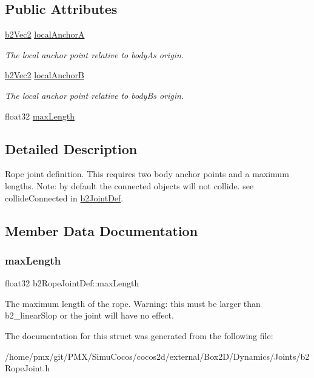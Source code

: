 \subsection*{Public Attributes}
\begin{DoxyCompactItemize}
\item 
\mbox{\label{structb2RopeJointDef_ab680fcc3cd44741a7a824ddff86ff01e}} 
\hyperlink{structb2Vec2}{b2\+Vec2} \hyperlink{structb2RopeJointDef_ab680fcc3cd44741a7a824ddff86ff01e}{local\+AnchorA}
\begin{DoxyCompactList}\small\item\em The local anchor point relative to bodyA\textquotesingle{}s origin. \end{DoxyCompactList}\item 
\mbox{\label{structb2RopeJointDef_a3271da0e4027e25546aa6a81e8fbe4e2}} 
\hyperlink{structb2Vec2}{b2\+Vec2} \hyperlink{structb2RopeJointDef_a3271da0e4027e25546aa6a81e8fbe4e2}{local\+AnchorB}
\begin{DoxyCompactList}\small\item\em The local anchor point relative to bodyB\textquotesingle{}s origin. \end{DoxyCompactList}\item 
float32 \hyperlink{structb2RopeJointDef_a6efdcae22e2bdcfc3aae62da1a5f0d69}{max\+Length}
\end{DoxyCompactItemize}


\subsection{Detailed Description}
Rope joint definition. This requires two body anchor points and a maximum lengths. Note\+: by default the connected objects will not collide. see collide\+Connected in \hyperlink{structb2JointDef}{b2\+Joint\+Def}. 

\subsection{Member Data Documentation}
\mbox{\label{structb2RopeJointDef_a6efdcae22e2bdcfc3aae62da1a5f0d69}} 
\subsubsection{\texorpdfstring{max\+Length}{maxLength}}
{\footnotesize\ttfamily float32 b2\+Rope\+Joint\+Def\+::max\+Length}

The maximum length of the rope. Warning\+: this must be larger than b2\+\_\+linear\+Slop or the joint will have no effect. 

The documentation for this struct was generated from the following file\+:\begin{DoxyCompactItemize}
\item 
/home/pmx/git/\+P\+M\+X/\+Simu\+Cocos/cocos2d/external/\+Box2\+D/\+Dynamics/\+Joints/b2\+Rope\+Joint.\+h\end{DoxyCompactItemize}
